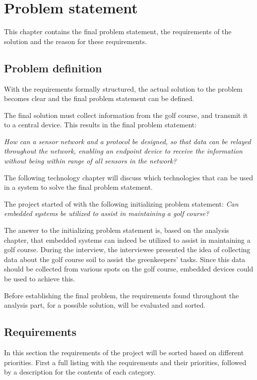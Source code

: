 \chapter{Problem statement}
This chapter contains the final problem statement, the requirements of the solution and the reason for these requirements.

\section{Problem definition}
With the requirements formally structured, the actual solution to the problem becomes clear and the final problem statement can be defined.

The final solution must collect information from the golf course, and transmit it to a central device. This results in the final problem statement:

\textit{How can a sensor network and a protocol be designed, so that data can be relayed throughout the network, enabling an endpoint device to receive the information without being within range of all sensors in the network?}

The following technology chapter will discuss which technologies that can be used in a system to solve the final problem statement.

The project started of with the following initializing problem statement:
\textit{Can embedded systems be utilized to assist in maintaining a golf course?}

The answer to the initializing problem statement is, based on the analysis chapter, that embedded systems can indeed be utilized to assist in maintaining a golf course. During the interview, the interviewee presented the idea of collecting data about the golf course soil to assist the greenkeepers' tasks. Since this data should be collected from various spots on the golf course, embedded devices could be used to achieve this.

Before establishing the final problem, the requirements found throughout the analysis part, for a possible solution, will be evaluated and sorted.

\section{Requirements}\label{cha:requirements}
In this section the requirements of the project will be sorted based on different priorities. First a full listing with the requirements and their priorities, followed by a description for the contents of each category.

